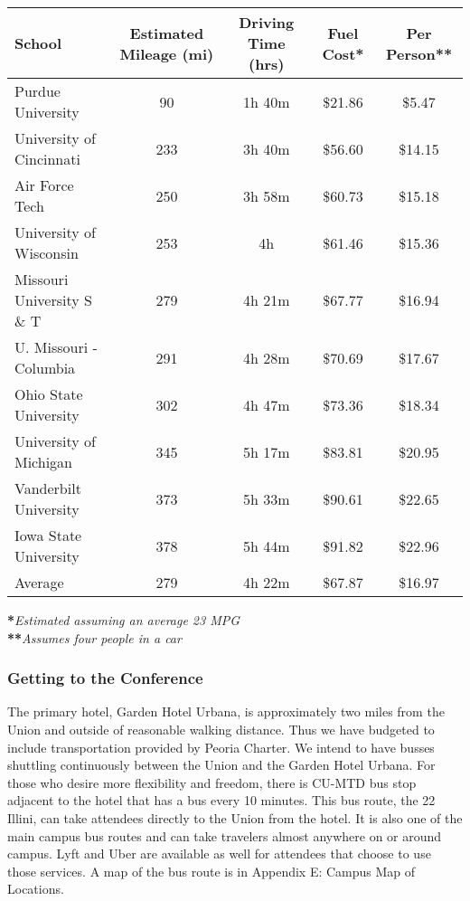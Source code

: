 \begin{center}
   \begin{tabular}{lcccc}
   \hline\hline
   \textbf{School}&\textbf{Estimated Mileage (mi)}&\textbf{Driving Time (hrs)}&\textbf{Fuel Cost*}&\textbf{Per Person**}\\
   \hline\hline
    Purdue University&90&1h 40m&\$21.86&\$5.47\\
    University of Cincinnati&233& 3h 40m&\$56.60&\$14.15\\
    Air Force Tech &250&3h 58m&\$60.73&\$15.18\\
    University of Wisconsin&253&4h&\$61.46&\$15.36\\
    Missouri University S \& T &279&4h 21m&\$67.77&\$16.94\\
    U. Missouri - Columbia&291&4h 28m&\$70.69&\$17.67\\
    Ohio State University&302&4h 47m&\$73.36&\$18.34\\
    University of Michigan&345&5h 17m&\$83.81&\$20.95\\
    Vanderbilt University&373&5h 33m&\$90.61&\$22.65\\
    Iowa State University&378&5h 44m&\$91.82&\$22.96\\
    \hline
    Average&279&4h 22m&\$67.87&\$16.97

    \end{tabular} 
\end{center}
\textbf{*}\textit{Estimated assuming an average 23 MPG}\\
\textbf{**}\textit{Assumes four people in a car}

\subsubsection{Getting to the Conference}
The primary hotel, Garden Hotel Urbana, is approximately two miles from the Union and outside of reasonable walking distance. Thus we have budgeted to include transportation provided by Peoria Charter. We intend to have busses shuttling continuously between the Union and the Garden Hotel Urbana. For those who desire more flexibility and freedom, there is CU-MTD bus stop adjacent to the hotel that has a bus every 10 minutes. This bus route, the 22 Illini, can take attendees directly to the Union from the hotel. It is also one of the main campus bus routes and can take travelers almost anywhere on or around campus. Lyft and Uber are available as well for attendees that choose to use those services. A map of the bus route is in Appendix E: Campus Map of Locations.

